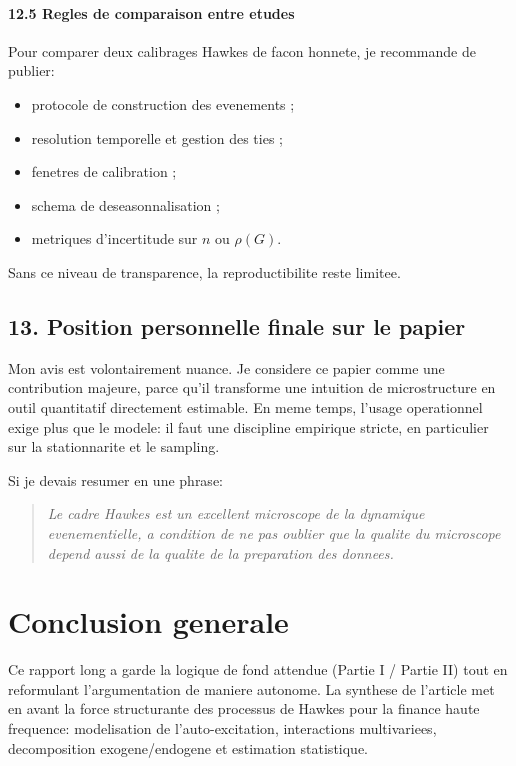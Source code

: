 \documentclass[11pt,a4paper]{article}
\begin{document}
\paragraph{12.5 Regles de comparaison entre etudes}
Pour comparer deux calibrages Hawkes de facon honnete, je recommande de publier:
\begin{itemize}[leftmargin=1.2cm]
    \item protocole de construction des evenements ;
    \item resolution temporelle et gestion des ties ;
    \item fenetres de calibration ;
    \item schema de deseasonnalisation ;
    \item metriques d'incertitude sur $n$ ou $\rho(G)$.
\end{itemize}

Sans ce niveau de transparence, la reproductibilite reste limitee.

\subsection*{13. Position personnelle finale sur le papier}

Mon avis est volontairement nuance. Je considere ce papier comme une contribution majeure, parce qu'il transforme une intuition de microstructure en outil quantitatif directement estimable. En meme temps, l'usage operationnel exige plus que le modele: il faut une discipline empirique stricte, en particulier sur la stationnarite et le sampling.

Si je devais resumer en une phrase:
\begin{quote}
\emph{Le cadre Hawkes est un excellent microscope de la dynamique evenementielle, a condition de ne pas oublier que la qualite du microscope depend aussi de la qualite de la preparation des donnees.}
\end{quote}

\newpage
\section*{Conclusion generale}

Ce rapport long a garde la logique de fond attendue (Partie I / Partie II) tout en reformulant l'argumentation de maniere autonome. La synthese de l'article met en avant la force structurante des processus de Hawkes pour la finance haute frequence: modelisation de l'auto-excitation, interactions multivariees, decomposition exogene/endogene et estimation statistique.
\end{document}
